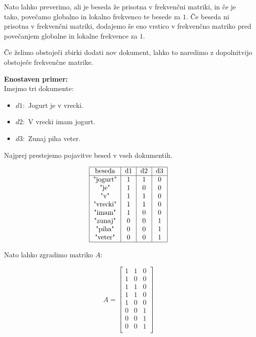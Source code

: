 \documentclass{article}
\begin{document}
Nato lahko preverimo, ali je beseda že prisotna v frekvenčni matriki, in če je tako, povečamo globalno in lokalno frekvenco te besede za $1$. Če beseda ni prisotna v frekvenčni matriki, dodajemo še eno vrstico v frekvenčno matriko pred povečanjem globalne in lokalne frekvence za $1$.

Če želimo obstoječi zbirki dodati nov dokument, lahko to naredimo z dopolnitvijo obstoječe frekvenčne matrike.



\textbf{Enostaven primer:}\\
Imejmo tri dokumente:

\begin{itemize}
    \item $d1:$ Jogurt je v vrecki.
    \item $d2:$ V vrecki imam jogurt.
    \item $d3:$ Zunaj piha veter.
\end{itemize}

Najprej prestejemo pojavitve besed v vseh dokumentih.

\[
\begin{tabular}{ |c|c|c|c| } 
    \hline
    beseda    & d1 &  d2  & d3\\
    \hline
    "jogurt"    & 1 & 1 & 0 \\ 
    "je"        & 1 & 0 & 0 \\ 
    "v"         & 1 & 1 & 0 \\ 
    "vrecki"    & 1 & 1 & 0 \\ 
    "imam"      & 1 & 0 & 0 \\ 
    "zunaj"     & 0 & 0 & 1 \\ 
    "piha"      & 0 & 0 & 1 \\ 
    "veter"     & 0 & 0 & 1 \\ 
    \hline
\end{tabular}
\]

Nato lahko zgradimo matriko $A$:

\[
A = \begin{bmatrix}
        1 & 1 & 0 \\
        1 & 0 & 0 \\
        1 & 1 & 0 \\
        1 & 1 & 0 \\
        1 & 0 & 0 \\
        0 & 0 & 1 \\
        0 & 0 & 1 \\       
        0 & 0 & 1 \\
 \end{bmatrix}
\]
\end{document}
